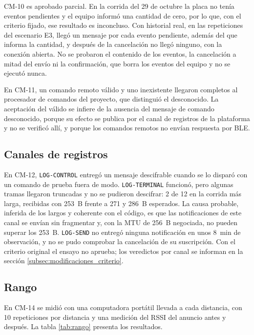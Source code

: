 CM-10 es aprobado parcial. En la corrida del 29 de octubre la placa no tenía eventos pendientes y el equipo informó una cantidad de cero, por lo que, con el criterio fijado, ese resultado es inconcluso. Con historial real, en las repeticiones del escenario E3, llegó un mensaje por cada evento pendiente, además del que informa la cantidad, y después de la cancelación no llegó ninguno, con la conexión abierta. No se probaron el contenido de los eventos, la cancelación a mitad del envío ni la confirmación, que borra los eventos del equipo y no se ejecutó nunca.

En CM-11, un comando remoto válido y uno inexistente llegaron completos al procesador de comandos del proyecto, que distinguió el desconocido. La aceptación del válido se infiere de la ausencia del mensaje de comando desconocido, porque su efecto se publica por el canal de registros de la plataforma y no se verificó allí, y porque los comandos remotos no envían respuesta por BLE.

\subsection{Canales de registros}
\label{subsec:ensayos_registros}

En CM-12, \texttt{LOG-CONTROL} entregó un mensaje descifrable cuando se lo disparó con un comando de prueba fuera de modo. \texttt{LOG-TERMINAL} funcionó, pero algunas tramas llegaron truncadas y no se pudieron descifrar: 2 de 12 en la corrida más larga, recibidas con 253~B frente a 271 y 286~B esperados. La causa probable, inferida de los largos y coherente con el código, es que las notificaciones de este canal se envían sin fragmentar y, con la MTU de 256~B negociada, no pueden superar los 253~B. \texttt{LOG-SEND} no entregó ninguna notificación en unos 8~min de observación, y no se pudo comprobar la cancelación de su suscripción. Con el criterio original el ensayo no aprueba; los veredictos por canal se informan en la sección \ref{subsec:modificaciones_criterio}.

\subsection{Rango}
\label{subsec:ensayos_rango}

En CM-14 se midió con una computadora portátil llevada a cada distancia, con 10 repeticiones por distancia y una medición del RSSI del anuncio antes y después. La tabla \ref{tab:rango} presenta los resultados.

